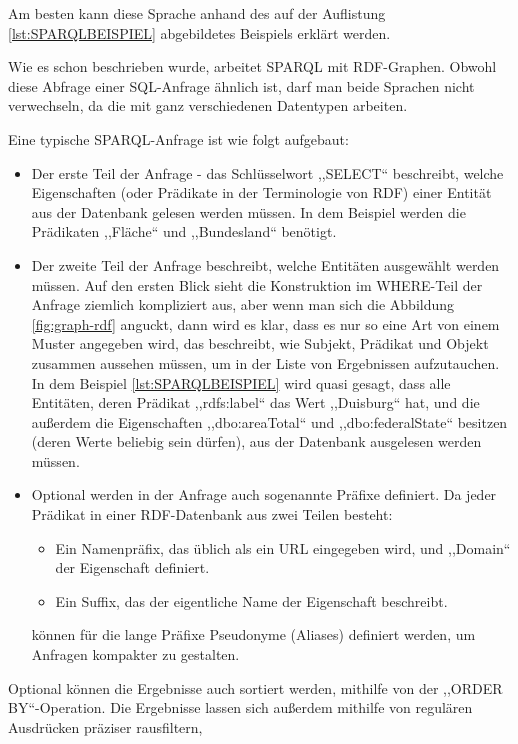 Am besten kann diese Sprache anhand des auf der Auflistung \ref{lst:SPARQLBEISPIEL} abgebildetes Beispiels erklärt werden.
\lstset{language=SPARQL}


Wie es schon beschrieben wurde, arbeitet SPARQL mit RDF-Graphen. Obwohl diese Abfrage einer SQL-Anfrage ähnlich ist, darf man beide Sprachen nicht verwechseln, da die mit ganz verschiedenen Datentypen arbeiten. 

Eine typische SPARQL-Anfrage ist wie folgt aufgebaut:
\begin{itemize}
\item Der erste Teil der Anfrage - das Schlüsselwort ,,SELECT`` beschreibt, welche Eigenschaften (oder Prädikate in der Terminologie von RDF) einer Entität aus der Datenbank gelesen werden müssen. In dem Beispiel werden die Prädikaten ,,Fläche`` und ,,Bundesland`` benötigt.
\item Der zweite Teil der Anfrage beschreibt, welche Entitäten ausgewählt werden müssen. Auf den ersten Blick sieht die Konstruktion im WHERE-Teil der Anfrage ziemlich kompliziert aus, aber wenn man sich die Abbildung \ref{fig:graph-rdf} anguckt, dann wird es klar, dass es nur so eine Art von einem Muster angegeben wird, das beschreibt, wie Subjekt, Prädikat und Objekt zusammen aussehen müssen, um in der Liste von Ergebnissen aufzutauchen. In dem Beispiel \ref{lst:SPARQLBEISPIEL} wird quasi gesagt, dass alle Entitäten, deren Prädikat ,,rdfs:label`` das Wert ,,Duisburg`` hat, und die  außerdem die Eigenschaften ,,dbo:areaTotal`` und ,,dbo:federalState`` besitzen (deren Werte beliebig sein dürfen), aus der Datenbank ausgelesen werden müssen.
\item Optional werden in der Anfrage auch sogenannte Präfixe definiert. Da jeder Prädikat in einer RDF-Datenbank aus zwei Teilen besteht:
\begin{itemize}
\item Ein Namenpräfix, das üblich als ein URL eingegeben wird, und ,,Domain`` der Eigenschaft definiert.
\item Ein Suffix, das der eigentliche Name der Eigenschaft beschreibt.
\end{itemize}
können für die lange Präfixe Pseudonyme (Aliases) definiert werden, um Anfragen kompakter zu gestalten.
\end{itemize}

Optional können die Ergebnisse auch sortiert werden, mithilfe von der ,,ORDER BY``-Operation. Die Ergebnisse lassen sich außerdem mithilfe von regulären Ausdrücken präziser rausfiltern,


